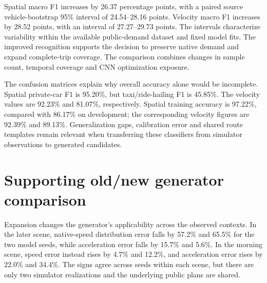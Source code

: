 

Spatial macro F1 increases by 26.37 percentage points, with a paired source vehicle-bootstrap 95\% interval of 24.54--28.16 points. Velocity macro F1 increases by 28.52 points, with an interval of 27.27--29.73 points. The intervals characterize variability within the available public-demand dataset and fixed model fits. The improved recognition supports the decision to preserve native demand and expand complete-trip coverage. The comparison combines changes in sample count, temporal coverage and CNN optimization exposure.




The confusion matrices explain why overall accuracy alone would be incomplete. Spatial private-car F1 is 95.20\%, but taxi/ride-hailing F1 is 45.85\%. The velocity values are 92.23\% and 81.07\%, respectively. Spatial training accuracy is 97.22\%, compared with 86.17\% on development; the corresponding velocity figures are 92.39\% and 89.13\%. Generalization gaps, calibration error and shared route templates remain relevant when transferring these classifiers from simulator observations to generated candidates.

\FloatBarrier

\FloatBarrier
\section{Supporting old/new generator comparison}
\label{sec:corpus-generator-supplement}


Expansion changes the generator's applicability across the observed contexts. In the later scene, native-speed distribution error falls by 57.2\% and 65.5\% for the two model seeds, while acceleration error falls by 15.7\% and 5.6\%. In the morning scene, speed error instead rises by 4.7\% and 12.2\%, and acceleration error rises by 22.0\% and 34.4\%. The signs agree across seeds within each scene, but there are only two simulator realizations and the underlying public plans are shared.

